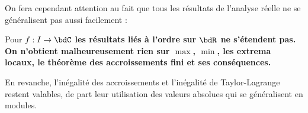 \documentclass[a4paper,french,bookmarks]{article}
\begin{document}
On fera cependant attention au fait que tous les résultats de l'analyse réelle ne se généralisent pas aussi facilement :

\begin{warning}{}{}
    Pour $f : I \to \bdC$  \bf{les résultats liés à l'ordre sur $\bdR$ ne s'étendent pas}. On n'obtient malheureusement \bf{rien sur $\max$, $\min$, les extrema locaux, le théorème des accroissements fini et ses conséquences}.
    
    En revanche, l'inégalité des accroissements et l'inégalité de Taylor-Lagrange restent valables, de part leur utilisation des valeurs absolues qui se généralisent en modules.
\end{warning}
\end{document}
